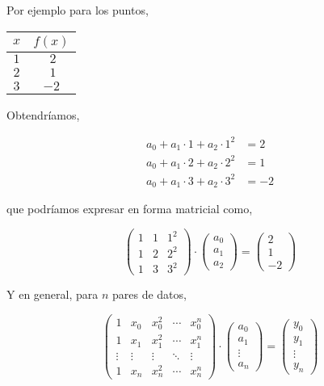 Por ejemplo para los puntos,

\begin{table}[h]
\centering 
\begin{tabular}{c|c}
$x$&$f(x)$\\ 
\hline
$1$&$\ 2$\\
$2$&$ \ 1$\\
$3$&$-2$
\end{tabular}
\label{tpuntos4}
\end{table}

Obtendríamos,

\begin{align*}
a_0+a_1\cdot 1+ a_2\cdot 1^2&=2\\
a_0+a_1\cdot 2+ a_2\cdot 2^2&=1\\
a_0+a_1\cdot 3+ a_2\cdot 3^2&=-2
\end{align*}

que podríamos expresar en forma matricial como,



\begin{equation*}
\begin{pmatrix}
1&1&1^2\\
1&2&2^2\\
1&3&3^2
\end{pmatrix}\cdot \begin{pmatrix}
a_0\\
a_1\\
a_2
\end{pmatrix}=\begin{pmatrix}
2\\
1\\
-2
\end{pmatrix}
\end{equation*}

Y en general, para $n$ pares de datos,

\begin{equation*}
\begin{pmatrix}
1&x_0&x_0^2&\cdots &x_0^n\\
1&x_1&x_1^2&\cdots &x_1^n\\
\vdots&\vdots&\vdots&\ddots&\vdots\\
1&x_n&x_n^2&\cdots &x_n^n
\end{pmatrix}\cdot \begin{pmatrix}
a_0\\
a_1\\
\vdots\\
a_n

\end{pmatrix}=\begin{pmatrix}
y_0\\
y_1\\
\vdots\\
y_n
\end{pmatrix}
\end{equation*}

